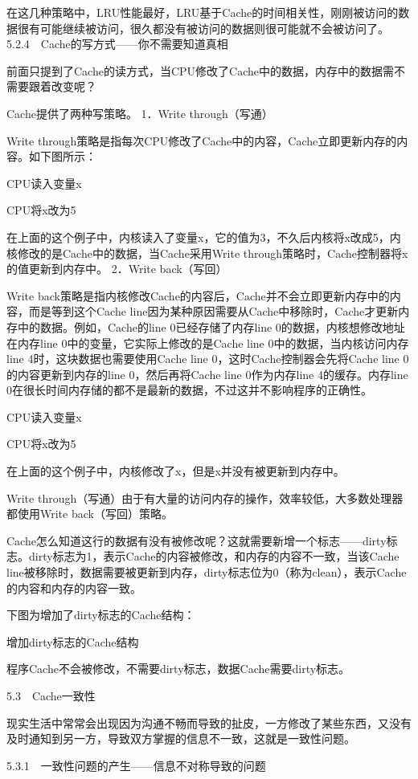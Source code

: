 \documentclass[12pt,UTF8]{ctexbook}
\begin{document}
在这几种策略中，LRU性能最好，LRU基于Cache的时间相关性，刚刚被访问的数据很有可能继续被访问，很久都没有被访问的数据则很可能就不会被访问了。
5.2.4　Cache的写方式——你不需要知道真相

前面只提到了Cache的读方式，当CPU修改了Cache中的数据，内存中的数据需不需要跟着改变呢？

Cache提供了两种写策略。
1．Write through（写通）

Write through策略是指每次CPU修改了Cache中的内容，Cache立即更新内存的内容。如下图所示：

CPU读入变量x

CPU将x改为5

在上面的这个例子中，内核读入了变量x，它的值为3，不久后内核将x改成5，内核修改的是Cache中的数据，当Cache采用Write through策略时，Cache控制器将x的值更新到内存中。
2．Write back（写回）

Write back策略是指内核修改Cache的内容后，Cache并不会立即更新内存中的内容，而是等到这个Cache line因为某种原因需要从Cache中移除时，Cache才更新内存中的数据。例如，Cache的line 0已经存储了内存line 0的数据，内核想修改地址在内存line 0中的变量，它实际上修改的是Cache line 0中的数据，当内核访问内存line 4时，这块数据也需要使用Cache line 0，这时Cache控制器会先将Cache line 0的内容更新到内存的line 0，然后再将Cache line 0作为内存line 4的缓存。内存line 0在很长时间内存储的都不是最新的数据，不过这并不影响程序的正确性。

CPU读入变量x

CPU将x改为5

在上面的这个例子中，内核修改了x，但是x并没有被更新到内存中。

Write through（写通）由于有大量的访问内存的操作，效率较低，大多数处理器都使用Write back（写回）策略。

Cache怎么知道这行的数据有没有被修改呢？这就需要新增一个标志——dirty标志。dirty标志为1，表示Cache的内容被修改，和内存的内容不一致，当该Cache line被移除时，数据需要被更新到内存，dirty标志位为0（称为clean），表示Cache的内容和内存的内容一致。

下图为增加了dirty标志的Cache结构：

增加dirty标志的Cache结构

程序Cache不会被修改，不需要dirty标志，数据Cache需要dirty标志。


5.3　Cache一致性

现实生活中常常会出现因为沟通不畅而导致的扯皮，一方修改了某些东西，又没有及时通知到另一方，导致双方掌握的信息不一致，这就是一致性问题。

5.3.1　一致性问题的产生——信息不对称导致的问题
\end{document}
